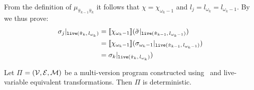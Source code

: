 \begin{myproof}
\noindent From the definition of $\mu_{\hat{\pi}_{k-1}\hat{\pi}_k}$ it follows that $\chi=\chi_{\omega_k-1}$ and $l_j=l_{\omega_k}=l_{\omega_k-1}$. By  we thus prove:
\begin{align*}
\sigma_j\vert_{\text{${\tt live}$}(\hat{\pi}_{k},\,l_{\omega_k})} &= [\![\chi_{\omega_k-1}]\!](\tilde{\sigma}\vert_{\text{${\tt live}$}(\hat{\pi}_{k-1},\,l_{\omega_k-1})})\\
&=[\![\chi_{\omega_k-1}]\!](\sigma_{\omega_k-1}\vert_{\text{${\tt live}$}(\hat{\pi}_{k-1},\,l_{\omega_k-1})})\\
&=\sigma_k\vert_{\text{${\tt live}$}(\hat{\pi}_{k},\,l_{\omega_k})})
\end{align*}
\end{myproof}

\begin{theorem}
\label{th:mv-prog-determ}
Let $\Pi$ $=({\cal V}, {\cal E}, {\cal M})$ be a multi-version program constructed using \dopasses\ and live-variable equivalent transformations. Then $\Pi$ is deterministic.
\end{theorem}

